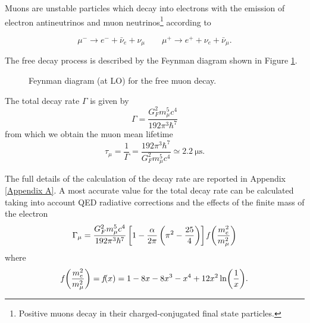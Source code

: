 Muons are unstable particles which decay into electrons with the emission of electron antineutrinos and muon neutrinos\footnote{Positive muons decay in their charged-conjugated final state particles.} according to

\begin{equation} \label{muon decay}
\mu^- \rightarrow e^- + \bar \nu_{e} + \nu_{\mu} \qquad \mu^+ \rightarrow e^+ + \nu_{e} + \bar \nu_{\mu} . 
\end{equation}

The free decay process is described by the Feynman diagram shown in Figure \ref{feynman}.
\begin{figure}[!h]
	\centering	
	
	\caption{Feynman diagram (at LO) for the free muon decay.}\label{feynman}
\end{figure}

The total decay rate $\Gamma$ is given by \cite{Measday}
\begin{equation} \label{Gamma}
\Gamma = \frac{ G_{F}^2 m_{\mu}^5 c^4}{192 \pi^3 \hbar^7} 
\end{equation}
from which we obtain the muon mean lifetime
\begin{equation} \label{tau}
\tau_{\mu} = \frac{1}{\Gamma} = \frac{192 \pi^3 \hbar^7}{ G_{F}^2 m_{\mu}^5  c^4} \simeq \SI{2.2}{\micro\second} .
\end{equation}

The full details of the calculation of the decay rate are reported in Appendix \ref{Appendix A}.
A most accurate value for the total decay rate can be calculated taking into account QED radiative corrections and the effects of the finite mass of the electron \cite{Measday}
\begin{equation}
\Gamma_{\mu} =  \frac{ G_{F}^2 m_{\mu}^5 c^4}{192 \pi^3 \hbar^7} \left[ 1 - \frac{\alpha}{2 \pi} \left( \pi^2 - \frac{25}{4} \right) \right] \emph{f} \left( \frac{m_{e}^2}{m_{\mu}^2} \right) 
\end{equation}
where
\begin{equation}
\emph{f} \left( \frac{m_{e}^2}{m_{\mu}^2} \right) = \emph{f} (x) = 1 - 8x - 8 x^3 - x^4 + 12 x^2 \ln(\frac{1}{x}) .
\end{equation}

